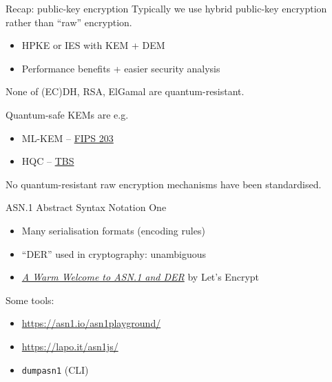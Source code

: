 \begin{frame}{Recap: public-key encryption}
  Typically we use hybrid public-key encryption rather than \enquote{raw} encryption.
  \begin{itemize}[<+(1)->]
    \item HPKE or IES with KEM + DEM
    \item Performance benefits + easier security analysis
  \end{itemize}

  \vspace*{1em}

  \pause
  None of (EC)DH, RSA, ElGamal are quantum-resistant.

  \pause
  Quantum-safe KEMs are e.g.
  \begin{itemize}
    \item ML-KEM -- \href{https://csrc.nist.gov/pubs/fips/203/final}{FIPS 203}
    \item HQC -- \href{https://www.nist.gov/news-events/news/2025/03/nist-selects-hqc-fifth-algorithm-post-quantum-encryption}{TBS}
  \end{itemize}

  \pause
  No quantum-resistant raw encryption mechanisms have been standardised.
\end{frame}

\begin{frame}{ASN.1}
  Abstract Syntax Notation One
  \begin{itemize}[<+(1)->]
    \item Many serialisation formats (encoding rules)
    \item \enquote{DER} used in cryptography: unambiguous
    \item \href{https://letsencrypt.org/docs/a-warm-welcome-to-asn1-and-der/}{\textit{A Warm Welcome to ASN.1 and DER}} by Let's Encrypt
  \end{itemize}

  \pause
  Some tools:
  \begin{itemize}[<+(1)->]
    \item \url{https://asn1.io/asn1playground/}
    \item \url{https://lapo.it/asn1js/}
    \item \texttt{dumpasn1} (CLI)
  \end{itemize}
\end{frame}

